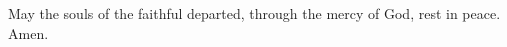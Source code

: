 
\rubric{\Vbar} May the souls of the faithful departed, through the mercy of God, rest in peace. \rubric{\Rbar} Amen.